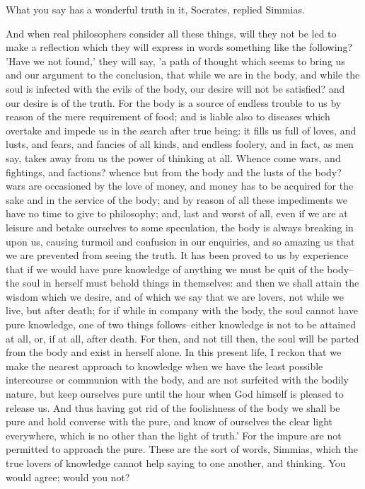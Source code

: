 What you say has a wonderful truth in it, Socrates, replied Simmias.

And when real philosophers consider all these things, will they not be
led to make a reflection which they will express in words something like
the following? 'Have we not found,' they will say, 'a path of thought
which seems to bring us and our argument to the conclusion, that while
we are in the body, and while the soul is infected with the evils of the
body, our desire will not be satisfied? and our desire is of the truth.
For the body is a source of endless trouble to us by reason of the mere
requirement of food; and is liable also to diseases which overtake and
impede us in the search after true being: it fills us full of loves, and
lusts, and fears, and fancies of all kinds, and endless foolery, and
in fact, as men say, takes away from us the power of thinking at all.
Whence come wars, and fightings, and factions? whence but from the body
and the lusts of the body? wars are occasioned by the love of money, and
money has to be acquired for the sake and in the service of the body;
and by reason of all these impediments we have no time to give to
philosophy; and, last and worst of all, even if we are at leisure and
betake ourselves to some speculation, the body is always breaking in
upon us, causing turmoil and confusion in our enquiries, and so amazing
us that we are prevented from seeing the truth. It has been proved to us
by experience that if we would have pure knowledge of anything we
must be quit of the body--the soul in herself must behold things in
themselves: and then we shall attain the wisdom which we desire, and of
which we say that we are lovers, not while we live, but after death; for
if while in company with the body, the soul cannot have pure knowledge,
one of two things follows--either knowledge is not to be attained at
all, or, if at all, after death. For then, and not till then, the soul
will be parted from the body and exist in herself alone. In this present
life, I reckon that we make the nearest approach to knowledge when we
have the least possible intercourse or communion with the body, and are
not surfeited with the bodily nature, but keep ourselves pure until the
hour when God himself is pleased to release us. And thus having got rid
of the foolishness of the body we shall be pure and hold converse with
the pure, and know of ourselves the clear light everywhere, which is
no other than the light of truth.' For the impure are not permitted to
approach the pure. These are the sort of words, Simmias, which the true
lovers of knowledge cannot help saying to one another, and thinking. You
would agree; would you not?

